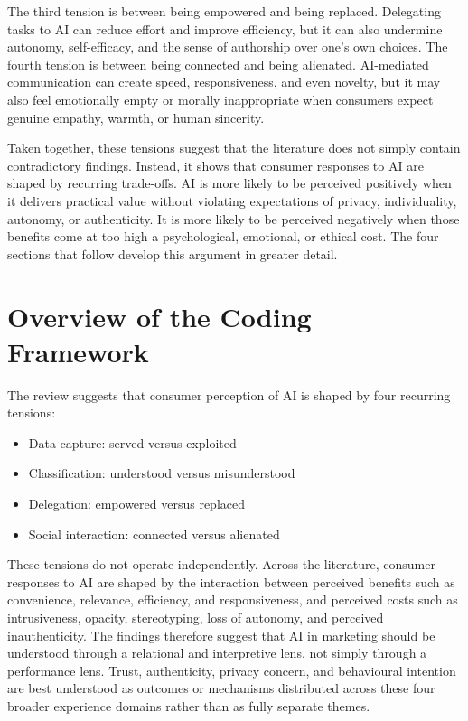 The third tension is between being empowered and being replaced. Delegating tasks to AI can reduce effort and improve efficiency, but it can also undermine autonomy, self-efficacy, and the sense of authorship over one's own choices. The fourth tension is between being connected and being alienated. AI-mediated communication can create speed, responsiveness, and even novelty, but it may also feel emotionally empty or morally inappropriate when consumers expect genuine empathy, warmth, or human sincerity.

Taken together, these tensions suggest that the literature does not simply contain contradictory findings. Instead, it shows that consumer responses to AI are shaped by recurring trade-offs. AI is more likely to be perceived positively when it delivers practical value without violating expectations of privacy, individuality, autonomy, or authenticity. It is more likely to be perceived negatively when those benefits come at too high a psychological, emotional, or ethical cost. The four sections that follow develop this argument in greater detail.

\section{Overview of the Coding Framework}
The review suggests that consumer perception of AI is shaped by four recurring tensions:

\begin{itemize}
    \item Data capture: served versus exploited
    \item Classification: understood versus misunderstood
    \item Delegation: empowered versus replaced
    \item Social interaction: connected versus alienated
\end{itemize}

These tensions do not operate independently. Across the literature, consumer responses to AI are shaped by the interaction between perceived benefits such as convenience, relevance, efficiency, and responsiveness, and perceived costs such as intrusiveness, opacity, stereotyping, loss of autonomy, and perceived inauthenticity. The findings therefore suggest that AI in marketing should be understood through a relational and interpretive lens, not simply through a performance lens. Trust, authenticity, privacy concern, and behavioural intention are best understood as outcomes or mechanisms distributed across these four broader experience domains rather than as fully separate themes.

